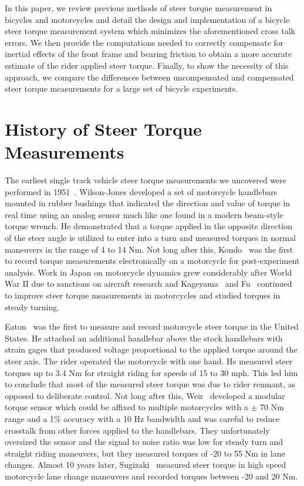 \documentclass[10pt]{article}
\begin{document}
In this paper, we review previous methods of steer torque measurement in
bicycles and motorcycles and detail the design and implementation of a bicycle
steer torque measurement system which minimizes the aforementioned cross talk
errors. We then provide the computations needed to correctly compensate for
inertial effects of the front frame and bearing friction to obtain a more
accurate estimate of the rider applied steer torque. Finally, to show the
necessity of this approach, we compare the differences between uncompensated
and compensated steer torque measurements for a large set of bicycle
experiments.

\section*{History of Steer Torque Measurements}


The earliest single track vehicle steer torque measurements we uncovered were
performed in 1951~\cite{Wilson-Jones1951}. Wilson-Jones developed a set of
motorcycle handlebars mounted in rubber bushings that indicated the direction
and value of torque in real time using an analog sensor much like one found in
a modern beam-style torque wrench. He demonstrated that a torque applied in the
opposite direction of the steer angle is utilized to enter into a turn and
measured torques in normal maneuvers in the range of 4 to 14 Nm. Not long after
this, Kondo~\cite{Kondo1955} was the first to record torque measurements
electronically on a motorcycle for post-experiment analysis. Work in Japan on
motorcycle dynamics grew considerably after World War II due to sanctions on
aircraft research and Kageyama~\cite{Kageyama1959} and Fu~\cite{Fu1965}
continued to improve steer torque measurements in motorcycles and studied
torques in steady turning.


Eaton~\cite{Eaton1973} was the first to measure and record motorcycle steer
torque in the United States. He attached an additional handlebar above the
stock handlebars with strain gages that produced voltage proportional to the
applied torque around the steer axis. The rider operated the motorcycle
with one hand. He measured steer torques up to 3.4 Nm for straight riding for
speeds of 15 to 30 mph. This led him to conclude that most of the measured
steer torque was due to rider remnant, as opposed to deliberate control. Not
long after this, Weir~\cite{Weir1979a} developed a modular torque sensor which
could be affixed to multiple motorcycles with a $\pm$ 70 Nm range and a 1\%
accuracy with a 10 Hz bandwidth and was careful to reduce crosstalk from other
forces applied to the handlebars. They unfortunately oversized the sensor and
the signal to noise ratio was low for steady turn and straight riding
maneuvers, but they measured torques of -20 to 55 Nm in lane changes. Almost 10
years later, Sugizaki~\cite{Sugizaki1988} measured steer torque in high speed
motorcycle lane change maneuvers and recorded torques between -20 and 20 Nm.
\end{document}
